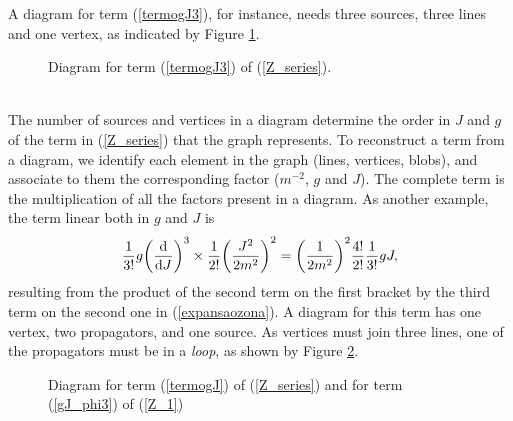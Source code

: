  A diagram for term (\ref{termogJ3}), for instance, needs three sources, three lines and one vertex, as indicated by Figure \ref{tres}.
 \begin{figure}[h]
 \centering
    \caption{Diagram for term (\ref{termogJ3}) of (\ref{Z_series}).}
    \label{tres}
\end{figure}\\

The number of sources and vertices in a diagram determine the order in $J$ and $g$ of the term in (\ref{Z_series}) that the graph represents.
To reconstruct a term from a diagram, we identify each element in the graph (lines, vertices, blobs), and associate to them the corresponding factor ($m^{-2}$, $g$ and $J$). The complete term is the multiplication of all the factors present in a diagram. As another example, the term linear both in $g$ and $J$ is
\begin{equation}
    \frac{1}{3!}g\qty(\dv{J})^3\times\frac{1}{2!}\qty(\frac{J^2}{2m^2})^2=\qty(\frac{1}{2m^2})^2\frac{4!}{2!}\frac{1}{3!}gJ,
    \label{termogJ}
\end{equation}
resulting from the product of the second term on the first bracket by the third term on the second one in (\ref{expansaozona}). A diagram for this term has one vertex, two propagators, and one source. As vertices must join three lines, one of the propagators must be in a \textit{loop}, as shown by Figure \ref{gJ}.
\begin{figure}[h]
    \centering
    \caption{Diagram for term (\ref{termogJ}) of (\ref{Z_series}) and for term (\ref{gJ_phi3}) of (\ref{Z_1})}
    \label{gJ}
\end{figure}

